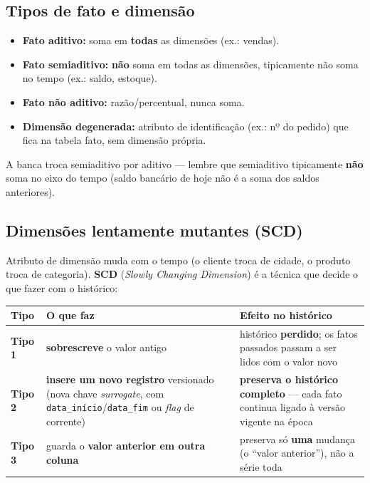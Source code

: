 \subsection{Tipos de fato e dimensão}

\begin{itemize}
\item \textbf{Fato aditivo:} soma em \textbf{todas} as dimensões (ex.:
vendas).
\item \textbf{Fato semiaditivo:} \textbf{não} soma em todas as dimensões,
tipicamente não soma no tempo (ex.: saldo, estoque).
\item \textbf{Fato não aditivo:} razão/percentual, nunca soma.
\item \textbf{Dimensão degenerada:} atributo de identificação (ex.: nº do
pedido) que fica na tabela fato, sem dimensão própria.
\end{itemize}

\begin{pegadinha}
A banca troca semiaditivo por aditivo --- lembre que semiaditivo tipicamente
\textbf{não} soma no eixo do tempo (saldo bancário de hoje não é a soma dos
saldos anteriores).
\end{pegadinha}

\subsection{Dimensões lentamente mutantes (SCD)}

Atributo de dimensão muda com o tempo (o cliente troca de cidade, o produto
troca de categoria). \textbf{SCD} (\textit{Slowly Changing Dimension}) é a
técnica que decide o que fazer com o histórico:

\begin{center}
\begin{tabular}{@{}p{1.9cm}p{4cm}p{5.2cm}@{}}
\toprule
\textbf{Tipo} & \textbf{O que faz} & \textbf{Efeito no histórico} \\
\midrule
\textbf{Tipo 1} & \textbf{sobrescreve} o valor antigo & histórico \textbf{perdido}; os fatos passados passam a ser lidos com o valor novo \\
\textbf{Tipo 2} & \textbf{insere um novo registro} versionado (nova chave \textit{surrogate}, com \texttt{data\_início}/\texttt{data\_fim} ou \textit{flag} de corrente) & \textbf{preserva o histórico completo} --- cada fato continua ligado à versão vigente na época \\
\textbf{Tipo 3} & guarda o \textbf{valor anterior em outra coluna} & preserva só \textbf{uma} mudança (o ``valor anterior''), não a série toda \\
\bottomrule
\end{tabular}
\end{center}

